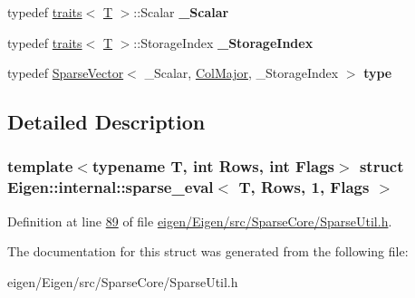 \begin{DoxyCompactItemize}
typedef \hyperlink{struct_eigen_1_1internal_1_1traits}{traits}$<$ \hyperlink{group___sparse_core___module}{T} $>$\+::Scalar {\bfseries \+\_\+\+Scalar}
\item 
\mbox{\label{struct_eigen_1_1internal_1_1sparse__eval_3_01_t_00_01_rows_00_011_00_01_flags_01_4_af5cedca3e3a701912033b4595e6cb12d}} 
typedef \hyperlink{struct_eigen_1_1internal_1_1traits}{traits}$<$ \hyperlink{group___sparse_core___module}{T} $>$\+::Storage\+Index {\bfseries \+\_\+\+Storage\+Index}
\item 
\mbox{\label{struct_eigen_1_1internal_1_1sparse__eval_3_01_t_00_01_rows_00_011_00_01_flags_01_4_a36cdbf653debd1b9b67ea574bde18b93}} 
typedef \hyperlink{group___sparse_core___module_class_eigen_1_1_sparse_vector}{Sparse\+Vector}$<$ \+\_\+\+Scalar, \hyperlink{group__enums_ggaacded1a18ae58b0f554751f6cdf9eb13a0cbd4bdd0abcfc0224c5fcb5e4f6669a}{Col\+Major}, \+\_\+\+Storage\+Index $>$ {\bfseries type}
\end{DoxyCompactItemize}


\subsection{Detailed Description}
\subsubsection*{template$<$typename T, int Rows, int Flags$>$\newline
struct Eigen\+::internal\+::sparse\+\_\+eval$<$ T, Rows, 1, Flags $>$}



Definition at line \hyperlink{eigen_2_eigen_2src_2_sparse_core_2_sparse_util_8h_source_l00089}{89} of file \hyperlink{eigen_2_eigen_2src_2_sparse_core_2_sparse_util_8h_source}{eigen/\+Eigen/src/\+Sparse\+Core/\+Sparse\+Util.\+h}.



The documentation for this struct was generated from the following file\+:\begin{DoxyCompactItemize}
\item 
eigen/\+Eigen/src/\+Sparse\+Core/\+Sparse\+Util.\+h\end{DoxyCompactItemize}
